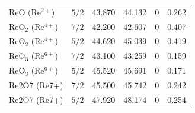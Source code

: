 \documentclass[12pt]{article}
\begin{document}
\begin{table}[H]
\begin{threeparttable}
\begin{tabular}{llrrrr}
$\mathrm{ReO}$ ($\mathrm{Re^{2+}}$) & $5/2$ & 43.870 & 44.132 & 0 & 0.262 \\
$\mathrm{ReO_2}$ ($\mathrm{Re^{4+}}$) & $7/2$ & 42.200 & 42.607 & 0 & 0.407 \\
$\mathrm{ReO_2}$ ($\mathrm{Re^{4+}}$) & $5/2$ & 44.620 & 45.039 & 0 & 0.419 \\
$\mathrm{ReO_3}$ ($\mathrm{Re^{6+}}$) & $7/2$ & 43.100 & 43.259 & 0 & 0.159 \\
$\mathrm{ReO_3}$ ($\mathrm{Re^{6+}}$) & $5/2$ & 45.520 & 45.691 & 0 & 0.171 \\
Re2O7 (Re7+) & $7/2$ & 45.500 & 45.742 & 0 & 0.242 \\
Re2O7 (Re7+) & $5/2$ & 47.920 & 48.174 & 0 & 0.254 \\
\bottomrule
\end{tabular}
\end{threeparttable}
\end{table}
\end{document}
